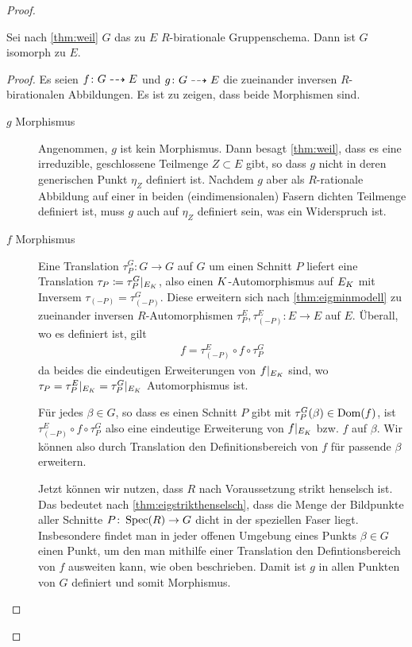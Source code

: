 \documentclass[german]{scrreprt}
\begin{document}
\begin{Satz}
\begin{proof}
    \begin{Lemma}\label{thm:äqgruppenschema}
      Sei nach \ref{thm:weil} $G$ das zu $E$ $R$-birationale
      Gruppenschema. Dann ist $G$ isomorph zu $E$.
      \begin{proof}
        Es seien $f\colon G\dashrightarrow E$ und $g\colon G\dashrightarrow E$ die
        zueinander inversen $R$-birationalen Abbildungen.
        Es ist zu zeigen, dass beide Morphismen sind.
        \begin{description}
        \item[$g$ Morphismus] Angenommen, $g$ ist kein
          Morphismus. Dann besagt \ref{thm:weil}, dass es eine
          irreduzible, geschlossene Teilmenge $Z\subset E$ gibt, so
          dass $g$ nicht in deren generischen Punkt $\eta_Z$ definiert
          ist. Nachdem $g$ aber als $R$-rationale Abbildung auf einer
          in beiden (eindimensionalen) Fasern dichten Teilmenge
          definiert ist, muss $g$ auch auf $\eta_Z$ definiert sein,
          was ein Widerspruch ist.
        \item[$f$ Morphismus] Eine Translation $\tau_P^G\colon G\to G$
          auf $G$ um einen Schnitt $P$ liefert eine Translation
          $\tau_P\coloneqq\tau_P^G|_{E_{K}}$, also einen
          $K$-Automorphismus auf $E_{K}$ mit Inversem
          $\tau_{(-P)}=\tau_{(-P)}^G$. Diese 
          erweitern sich nach \ref{thm:eigminmodell} zu zueinander
          inversen $R$-Automorphismen
          $\tau_P^E,\tau_{(-P)}^E\colon E\to E$ auf $E$.
          Überall, wo es definiert ist, gilt
          \begin{gather*}
            f = \tau_{(-P)}^E\circ f\circ \tau_P^G
          \end{gather*}
          da beides die eindeutigen Erweiterungen von $f|_{E_{K}}$
          sind, wo $\tau_P=\tau_P^E|_{E_{K}}=\tau_P^G|_{E_{K}}$
          Automorphismus ist.
          
          Für jedes $\beta\in G$, so dass es einen Schnitt $P$ gibt mit
          $\tau_P^G(\beta)\in\operatorname{Dom}(f)$, ist $\tau_{(-P)}^E\circ f\circ
          \tau_P^G$ also eine eindeutige Erweiterung von $f|_{E_{K}}$
          bzw. $f$ auf $\beta$.
          Wir können also durch Translation den Definitionsbereich von
          $f$ für passende $\beta$ erweitern.

          Jetzt können wir nutzen, dass $R$ nach Voraussetzung strikt
          henselsch ist. Das bedeutet nach
          \ref{thm:eigstrikthenselsch}, dass die Menge der Bildpunkte
          aller Schnitte $P\colon\operatorname{Spec}(R)\to G$ dicht in der
          speziellen Faser liegt.
          Insbesondere findet man in jeder offenen Umgebung eines
          Punkts $\beta\in G$ einen Punkt, um den man mithilfe einer
          Translation den Defintionsbereich von $f$ ausweiten kann, wie
          oben beschrieben.
          Damit ist $g$ in allen Punkten von $G$ definiert und somit
          Morphismus.
        \end{description}
      \end{proof}
    \end{Lemma}


\end{proof}
\end{Satz}
\end{document}
